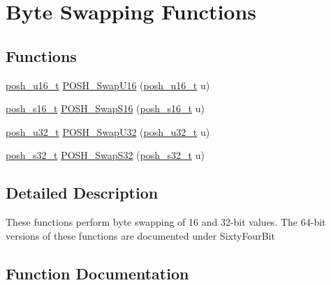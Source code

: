 \hypertarget{group__ByteSwapFunctions}{}\section{Byte Swapping Functions}
\label{group__ByteSwapFunctions}
\subsection*{Functions}
\begin{DoxyCompactItemize}
\item 
\hyperlink{group__PoshTypes_ga8ef2f2264276677d018795b0ff67d486}{posh\+\_\+u16\+\_\+t} \hyperlink{group__ByteSwapFunctions_ga401e0af0e8d08dba16164b5c8c9b3afd}{P\+O\+S\+H\+\_\+\+Swap\+U16} (\hyperlink{group__PoshTypes_ga8ef2f2264276677d018795b0ff67d486}{posh\+\_\+u16\+\_\+t} u)
\item 
\hyperlink{group__PoshTypes_gabb2c3e11f94548b8c3bc63fbbe7c2110}{posh\+\_\+s16\+\_\+t} \hyperlink{group__ByteSwapFunctions_ga0b4aa282339ed3629dd4517deb777387}{P\+O\+S\+H\+\_\+\+Swap\+S16} (\hyperlink{group__PoshTypes_gabb2c3e11f94548b8c3bc63fbbe7c2110}{posh\+\_\+s16\+\_\+t} u)
\item 
\hyperlink{group__PoshTypes_ga020bf929bf912667f0fa4312d816c2e0}{posh\+\_\+u32\+\_\+t} \hyperlink{group__ByteSwapFunctions_ga97f53ca21ec6feab173b13693f714b27}{P\+O\+S\+H\+\_\+\+Swap\+U32} (\hyperlink{group__PoshTypes_ga020bf929bf912667f0fa4312d816c2e0}{posh\+\_\+u32\+\_\+t} u)
\item 
\hyperlink{group__PoshTypes_gaa13412fdeac2c495d0e0278bd28ac8cb}{posh\+\_\+s32\+\_\+t} \hyperlink{group__ByteSwapFunctions_ga489b591bc4db4d2682be5f69cc5acb24}{P\+O\+S\+H\+\_\+\+Swap\+S32} (\hyperlink{group__PoshTypes_gaa13412fdeac2c495d0e0278bd28ac8cb}{posh\+\_\+s32\+\_\+t} u)
\end{DoxyCompactItemize}


\subsection{Detailed Description}
These functions perform byte swapping of 16 and 32-\/bit values. The 64-\/bit versions of these functions are documented under Sixty\+Four\+Bit 

\subsection{Function Documentation}
